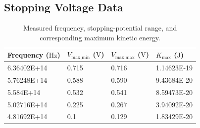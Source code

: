 \documentclass[12pt,a4paper]{article}
\begin{document}
\subsection{Stopping Voltage Data}
\begin{table}[H]
    \centering
    \begin{tabular}{llll}
    \hline
        Frequency ($\mathrm{Hz}$) & $V_\text{max,min}$ ($\mathrm{V}$) & $V_\text{max,max}$ ($\mathrm{V}$) & $K_{\max}$ ($\mathrm{J}$) \\ \hline
        6.36402E+14 & 0.715 & 0.716 & 1.14623E-19 \\ 
        5.76248E+14 & 0.588 & 0.590 & 9.43684E-20 \\
        5.584E+14 & 0.532 & 0.541 & 8.59473E-20 \\ 
        5.02716E+14 & 0.225 & 0.267 & 3.94092E-20 \\
        4.81692E+14 & 0.1 & 0.129 & 1.83429E-20 \\ \hline
    \end{tabular}
    \caption{Measured frequency, stopping-potential range, and corresponding maximum kinetic energy.}
    \label{tab:stopping_voltage_data}
\end{table}
\end{document}

